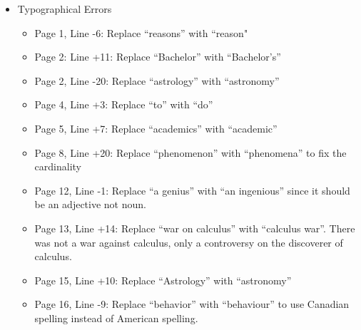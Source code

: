 \documentclass[11pt]{article}
\begin{document}
\begin{itemize}
	\item Typographical Errors
	\begin{itemize}
		\item Page 1, Line -6: Replace ``reasons” with ``reason"
		\item Page 2: Line +11: Replace ``Bachelor” with ``Bachelor’s”
		\item Page 2, Line -20: Replace ``astrology” with ``astronomy”
		\item Page 4, Line +3: Replace ``to” with ``do”
		\item Page 5, Line +7: Replace ``academics” with ``academic”
		\item Page 8, Line +20: Replace ``phenomenon” with ``phenomena” to fix the cardinality
		\item Page 12, Line -1: Replace ``a genius” with ``an ingenious” since it should be an adjective not noun.
		\item Page 13, Line +14: Replace ``war on calculus” with ``calculus war”. There was not a war against calculus, only a controversy on the discoverer of calculus.
		\item Page 15, Line +10: Replace ``Astrology” with ``astronomy”
		\item Page 16, Line -9: Replace ``behavior” with ``behaviour” to use Canadian spelling instead of American spelling.
	\end{itemize}
	

\end{itemize}
\end{document}
